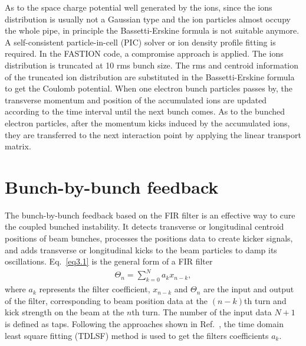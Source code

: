 \documentclass[aps,prab,reprint,superscriptaddress,showpacs,showkeys,letter]{revtex4-1}
\begin{document}
As to the space charge potential well generated by the ions, since the ions distribution is usually not a Gaussian type and the ion particles almost occupy the whole pipe, in principle the Bassetti-Erskine formula is not suitable anymore. A self-consistent particle-in-cell (PIC)  solver or ion density profile fitting is required. In the FASTION code, a  compromise approach is applied. The ions distribution is truncated at 10 rms bunch size. The rms and centroid information of the truncated ion distribution are substituted in the Bassetti-Erskine formula to get the Coulomb potential.  When one electron bunch particles passes by, the transverse momentum and position of the accumulated ions are updated according to the time interval until the next bunch comes. As to the bunched electron particles, after the momentum kicks induced by the accumulated ions, they are transferred to the next interaction point by applying the linear transport matrix. 

\section{Bunch-by-bunch feedback}
The bunch-by-bunch feedback based on the FIR filter is an effective way to cure the coupled bunched instability. It detects transverse or longitudinal centroid positions of beam bunches, processes the positions data to create  kicker signals, and adds transverse or longitudinal kicks to the beam particles to damp its oscillations. 
Eq.~\ref{eq3.1} is the general form of a FIR filter
\begin{eqnarray}\label{eq3.1}
\Theta_n= \sum_{k=0}^{N}a_k x_{n-k},
\end{eqnarray}
where $a_k$ represents the filter coefficient, $x_{n-k}$ and $\Theta_n$ are the input and output of the filter, corresponding to beam position data at the $(n-k)$th turn and kick strength on the beam at the $n$th turn. The number of the input data $N+1$ is defined as taps. Following the approaches shown in Ref.~\cite{21}, the time domain least square fitting (TDLSF) method is used to get the filters  coefficients $a_k$. 
\end{document}
